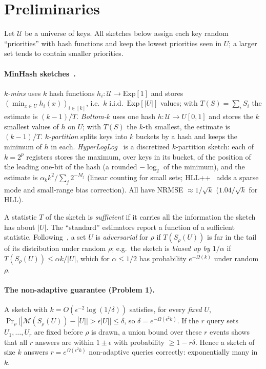 \documentclass{cccg20}
\newcommand{\Exp}{\mathrm{Exp}}
\newcommand{\est}{\mathcal{M}}
\begin{document}
\section{Preliminaries}

Let $\mathcal U$ be a universe of keys. All sketches below assign each key random ``priorities'' with hash functions and keep the lowest priorities seen in $U$; a larger set tends to contain smaller priorities.

\paragraph{MinHash sketches~\cite{ahmadian2024}.}
\emph{$k$-mins} uses $k$ hash functions $h_i:\mathcal U\to\Exp[1]$ and stores $(\min_{x\in U} h_i(x))_{i\in[k]}$, i.e.\ $k$ i.i.d.\ $\Exp[|U|]$ values; with $T(S)=\sum_i S_i$ the estimate is $(k-1)/T$.
\emph{Bottom-$k$} uses one hash $h:\mathcal U\to U[0,1]$ and stores the $k$ smallest values of $h$ on $U$; with $T(S)$ the $k$-th smallest, the estimate is $(k-1)/T$.
\emph{$k$-partition} splits keys into $k$ buckets by a hash and keeps the minimum of $h$ in each.
\emph{HyperLogLog}~\cite{flajolet2007} is a discretized $k$-partition sketch: each of $k=2^p$ registers stores the maximum, over keys in its bucket, of the position of the leading one-bit of the hash (a rounded $-\log_2$ of the minimum), and the estimate is $\alpha_k k^2/\sum_j 2^{-M_j}$ (linear counting for small sets; HLL++~\cite{heule2013} adds a sparse mode and small-range bias correction).
All have NRMSE $\approx 1/\sqrt{k}$ ($1.04/\sqrt{k}$ for HLL).

A statistic $T$ of the sketch is \emph{sufficient} if it carries all the information the sketch has about $|U|$. The ``standard'' estimators report a function of a sufficient statistic. Following~\cite{ahmadian2024}, a set $U$ is \emph{adversarial} for $\rho$ if $T(S_\rho(U))$ is far in the tail of its distribution under random $\rho$; e.g.\ the sketch is \emph{biased up by $1/\alpha$} if $T(S_\rho(U))\le \alpha k/|U|$, which for $\alpha\le 1/2$ has probability $e^{-\Omega(k)}$ under random $\rho$.

\paragraph{The non-adaptive guarantee (Problem 1).}
A sketch with $k=O(\epsilon^{-2}\log(1/\delta))$ satisfies, for every \emph{fixed} $U$,
$\Pr_\rho\bigl[|\est(S_\rho(U))-|U||>\epsilon|U|\bigr]\le\delta$,
so $\delta=e^{-\Omega(\epsilon^2 k)}$. If the $r$ query sets $U_1,\dots,U_r$ are fixed before $\rho$ is drawn, a union bound over these $r$ events shows that all $r$ answers are within $1\pm\epsilon$ with probability $\ge 1-r\delta$. Hence a sketch of size $k$ answers $r=e^{\Omega(\epsilon^2 k)}$ non-adaptive queries correctly: exponentially many in $k$.
\end{document}
